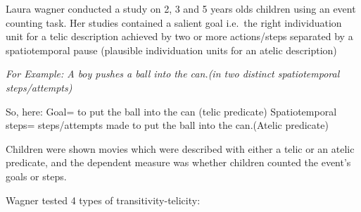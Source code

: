 \documentclass[11pt]{article}
\begin{document}
Laura wagner conducted a study on 2, 3 and 5 years olds children using
an event counting task. Her studies contained a salient goal i.e.~the
right individuation unit for a telic description achieved by two or more
actions/steps separated by a spatiotemporal pause (plausible
individuation units for an atelic description)

\emph{For Example: A boy pushes a ball into the can.(in two distinct
spatiotemporal steps/attempts)}

So, here: Goal= to put the ball into the can (telic predicate)
Spatiotemporal steps= steps/attempts made to put the ball into the
can.(Atelic predicate)

Children were shown movies which were described with either a telic or
an atelic predicate, and the dependent measure was whether children
counted the event's goals or steps.

Wagner tested 4 types of transitivity-telicity:
\end{document}
